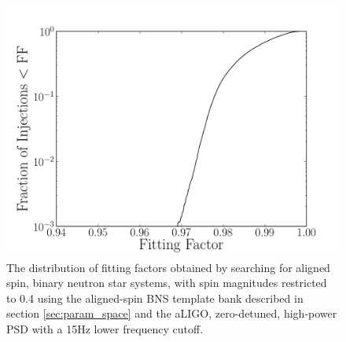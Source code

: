 \begin{figure}
\begin{center}
\includegraphics[width=1.0\textwidth]{papers/bns_spin/figure5.pdf}
\end{center}
\caption{\label{fig:anstar-aligned} The distribution of fitting factors obtained by searching
for aligned spin, binary neutron star systems, with spin magnitudes restricted to 0.4
using the aligned-spin BNS template bank described in section \ref{sec:param_space}
and the aLIGO, zero-detuned, high-power PSD with a 15Hz lower frequency cutoff.}
\end{figure}

